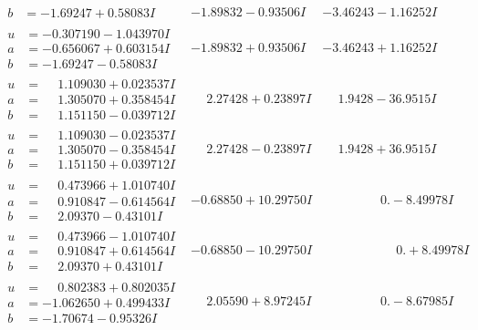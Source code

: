 \documentclass[1p]{elsarticle_modified}
\theoremstyle{definition}
\begin{document}
$$\begin{array}{c|c|c}
\begin{aligned}
b &= -1.69247 + 0.58083 I\end{aligned}
 & -1.89832 - 0.93506 I & -3.46243 - 1.16252 I \\ \hline\begin{aligned}
u &= -0.307190 - 1.043970 I \\
a &= -0.656067 + 0.603154 I \\
b &= -1.69247 - 0.58083 I\end{aligned}
 & -1.89832 + 0.93506 I & -3.46243 + 1.16252 I \\ \hline\begin{aligned}
u &= \phantom{-}1.109030 + 0.023537 I \\
a &= \phantom{-}1.305070 + 0.358454 I \\
b &= \phantom{-}1.151150 - 0.039712 I\end{aligned}
 & \phantom{-}2.27428 + 0.23897 I & \phantom{-}1.9428 - 36.9515 I \\ \hline\begin{aligned}
u &= \phantom{-}1.109030 - 0.023537 I \\
a &= \phantom{-}1.305070 - 0.358454 I \\
b &= \phantom{-}1.151150 + 0.039712 I\end{aligned}
 & \phantom{-}2.27428 - 0.23897 I & \phantom{-}1.9428 + 36.9515 I \\ \hline\begin{aligned}
u &= \phantom{-}0.473966 + 1.010740 I \\
a &= \phantom{-}0.910847 - 0.614564 I \\
b &= \phantom{-}2.09370 - 0.43101 I\end{aligned}
 & -0.68850 + 10.29750 I & \phantom{-0.000000 } 0. - 8.49978 I \\ \hline\begin{aligned}
u &= \phantom{-}0.473966 - 1.010740 I \\
a &= \phantom{-}0.910847 + 0.614564 I \\
b &= \phantom{-}2.09370 + 0.43101 I\end{aligned}
 & -0.68850 - 10.29750 I & \phantom{-0.000000 -}0. + 8.49978 I \\ \hline\begin{aligned}
u &= \phantom{-}0.802383 + 0.802035 I \\
a &= -1.062650 + 0.499433 I \\
b &= -1.70674 - 0.95326 I\end{aligned}
 & \phantom{-}2.05590 + 8.97245 I & \phantom{-0.000000 } 0. - 8.67985 I \\ \hline\begin{aligned}

\end{aligned}
\end{array}$$
\end{document}

